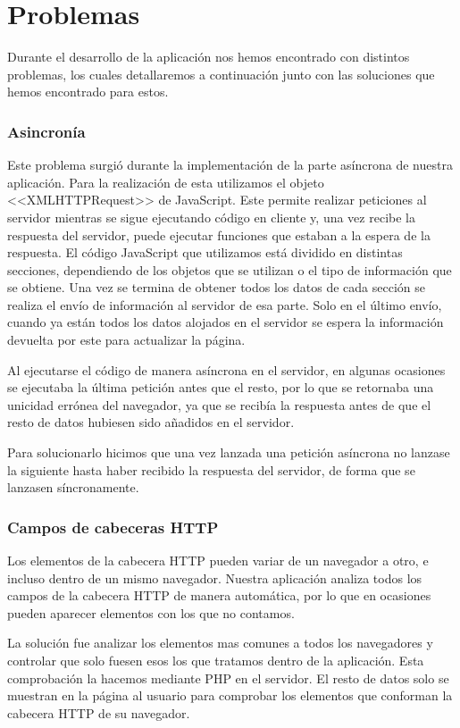\section{Problemas}
Durante el desarrollo de la aplicación nos hemos encontrado con distintos problemas, los cuales detallaremos a continuación junto con las soluciones que hemos encontrado para estos.
\subsubsection{Asincronía}
Este problema surgió durante la implementación de la parte asíncrona de nuestra aplicación. Para la realización de esta utilizamos el objeto  <<XMLHTTPRequest>> de JavaScript. Este permite realizar peticiones al servidor mientras se sigue ejecutando código en cliente y, una vez recibe la respuesta del servidor, puede ejecutar funciones que estaban a la espera de la respuesta. El código JavaScript que utilizamos está dividido en distintas secciones, dependiendo de los objetos que se utilizan o el tipo de información que se obtiene. Una vez se termina de obtener todos los datos de cada sección se realiza el envío de información al servidor de esa parte. Solo en el último envío, cuando ya están todos los datos alojados en el servidor se espera la información devuelta por este para actualizar la página.\par 
Al ejecutarse el código de manera asíncrona en el servidor, en algunas ocasiones se ejecutaba la última petición antes que el resto, por lo que se retornaba una unicidad errónea del navegador, ya que se recibía la respuesta antes de que el resto de datos hubiesen sido añadidos en el servidor.\par 
Para solucionarlo hicimos que una vez lanzada una petición asíncrona no lanzase la siguiente hasta haber recibido la respuesta del servidor, de forma que se lanzasen síncronamente.
\subsubsection{Campos de cabeceras HTTP}
Los elementos de la cabecera HTTP pueden variar de un navegador a otro, e incluso dentro de un mismo navegador. Nuestra aplicación analiza todos los campos de la cabecera HTTP de manera automática, por lo que en ocasiones pueden aparecer elementos con los que no contamos.\par 
La solución fue analizar los elementos mas comunes a todos los navegadores y controlar que solo fuesen esos los que tratamos dentro de la aplicación. Esta comprobación la hacemos mediante PHP en el servidor. El resto de datos solo se muestran en la página al usuario para comprobar los elementos que conforman la cabecera HTTP de su navegador.
